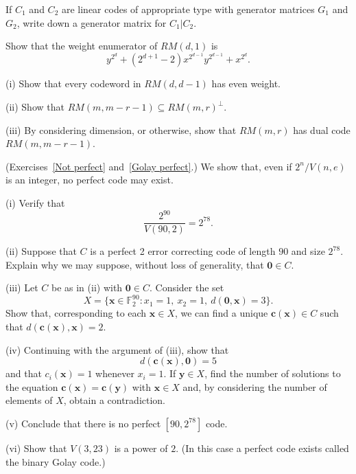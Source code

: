 \begin{question}\label{3.5}
If $C_{1}$ and $C_{2}$ are linear codes of appropriate
type with generator matrices $G_{1}$ and $G_{2}$,
write down a generator matrix for $C_{1}|C_{2}$.
\end{question}
\begin{question}\label{C3.6}
Show that the weight enumerator
of $RM(d,1)$ is
\[y^{2^{d}}+(2^{d+1}-2)x^{2^{d-1}}y^{2^{d-1}}+x^{2^{d}}.\]
\end{question}
\begin{question}\label{C3.7} 
(i) Show that every codeword in $RM(d,d-1)$ has even weight.

(ii) Show that $RM(m,m-r-1)\subseteq RM(m,r)^{\perp}$.

(iii) By considering dimension, or otherwise, show
that $RM(m,r)$ has dual code $RM(m,m-r-1)$.
\end{question}
\begin{question}\label{C3.8}
(Exercises~\ref{Not perfect} and~\ref{Golay perfect}.) 
We show that,
even if $2^{n}/V(n,e)$ is an integer,
no perfect code may exist.

(i) Verify that
\[\frac{2^{90}}{V(90,2)}=2^{78}.\]

(ii) Suppose that $C$ is a perfect 2 error correcting
code of length $90$ and size $2^{78}$. Explain
why we may suppose, without loss of generality,
that ${\boldsymbol 0}\in C$.

(iii) Let $C$ be as in (ii) with ${\boldsymbol 0}\in C$.
Consider the set
\[X=\{{\mathbf x}\in{\mathbb F}_{2}^{90}:
x_{1}=1,\ x_{2}=1,\ d({\boldsymbol 0},{\mathbf x})=3\}.\]
Show that, corresponding to each ${\mathbf x}\in X$,
we can find a unique ${\mathbf c}({\mathbf x})\in C$
such that $d({\mathbf c}({\mathbf x}),{\mathbf x})=2$.


(iv) Continuing with the argument of (iii), show
that
\[d({\mathbf c}({\mathbf x}),{\boldsymbol 0})=5\]
and that $c_{i}({\mathbf x})=1$ whenever $x_{i}=1$.
If  $\mathbf{y}\in X$,
find the number of solutions to the equation
${\mathbf c}({\mathbf x})={\mathbf c}({\mathbf y})$
with $\mathbf{x}\in X$
and, by considering the number of elements of $X$,
obtain a contradiction.

(v) Conclude that there is no perfect $[90,2^{78}]$ code.

(vi) Show that $V(3,23)$ is a power of $2$. (In this case
a perfect code exists called the binary Golay code.)
\end{question}

